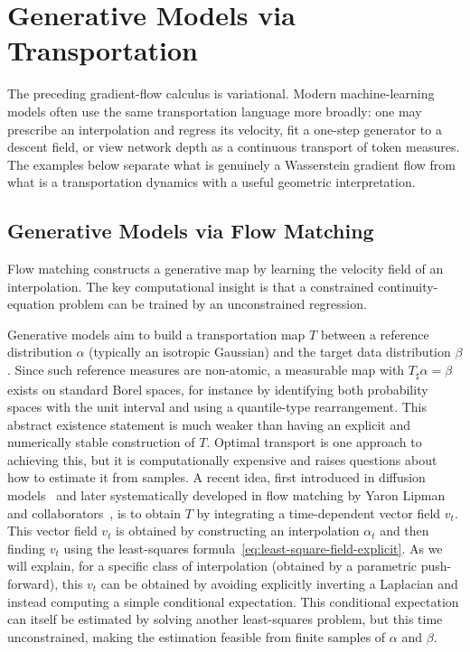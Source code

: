 
\section{Generative Models via Transportation}
\label{sec-generative-models-transportation}

The preceding gradient-flow calculus is variational. Modern machine-learning models often use the same transportation language more broadly: one may prescribe an interpolation and regress its velocity, fit a one-step generator to a descent field, or view network depth as a continuous transport of token measures. The examples below separate what is genuinely a Wasserstein gradient flow from what is a transportation dynamics with a useful geometric interpretation.

\subsection{Generative Models via Flow Matching}

Flow matching constructs a generative map by learning the velocity field of an interpolation. The key computational insight is that a constrained continuity-equation problem can be trained by an unconstrained regression.

Generative models aim to build a transportation map $T$ between a reference distribution $\alpha$ (typically an isotropic Gaussian) and the target data distribution $\beta$. Since such reference measures are non-atomic, a measurable map with $T_\sharp\alpha=\beta$ exists on standard Borel spaces, for instance by identifying both probability spaces with the unit interval and using a quantile-type rearrangement. This abstract existence statement is much weaker than having an explicit and numerically stable construction of $T$.
%
Optimal transport is one approach to achieving this, but it is computationally expensive and raises questions about how to estimate it from samples. A recent idea, first introduced in diffusion models~\cite{Ho2020DDPM,Song2021ScoreSDE} and later systematically developed in flow matching by Yaron Lipman and collaborators~\cite{Lipman2022FlowMatching}, is to obtain $T$ by integrating a time-dependent vector field $v_t$.
%
This vector field $v_t$ is obtained by constructing an interpolation $\alpha_t$ and then finding $v_t$ using the least-squares formula~\eqref{eq:least-square-field-explicit}. As we will explain, for a specific class of interpolation (obtained by a parametric push-forward), this $v_t$ can be obtained by avoiding explicitly inverting a Laplacian and instead computing a simple conditional expectation. This conditional expectation can itself be estimated by solving another least-squares problem, but this time unconstrained, making the estimation feasible from finite samples of $\alpha$ and $\beta$.

